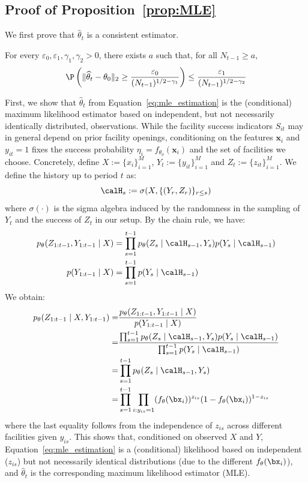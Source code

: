 \documentclass[blindrev]{informs3noheader}
\begin{document}
\subsection{Proof of Proposition~\ref{prop:MLE}}
We first prove that $\widehat{\theta}_t$ is a consistent estimator.
\begin{lemma}\label{lem:mle}
For every $\varepsilon_0, \varepsilon_1,\gamma_1,\gamma_2>0$, there exists $a$ such that, for all $N_{t-1}\geq a$,
         \begin{align}
        \P\left(\|\widehat{\theta}_t-\theta_0\|_2\geq  \frac{\varepsilon_0}{(N_{t-1})^{1/2-\gamma_1}}\right)\leq\frac{\varepsilon_1}{(N_{t-1})^{1/2-\gamma_2}} \label{eq:mle_bound}
    \end{align}
\end{lemma} 
First, we show that $\widehat{\theta}_t$ from Equation~\eqref{eq:mle_estimation} is the (conditional) maximum likelihood estimator based on independent, but not necessarily identically distributed, observations. While the facility success indicators $S_{it}$ may in general depend on prior facility openings, conditioning on the features $\bm{x}_i$ and $y_{it}=1$ fixes the success probability $\eta_i = f_{\theta_0}(\bm{x}_i)$ and the set of facilities we choose. Concretely, define $X :=\{x_i\}_{i=1}^M$, $Y_t:=\{y_{it}\}_{i=1}^M$ and $Z_t:=\{z_{it}\}_{i=1}^M$. We define the history up to period $t$ as:
\[\calH_s:=\sigma(X,\{(Y_r,Z_r)\}_{r\leq s})\]
where $\sigma(\cdot)$ is the sigma algebra induced by the randomness in the sampling of $Y_t$ and the success of $Z_t$ in our setup. By the chain rule, we have:
\begin{align*}
p_\theta(Z_{1:t-1},Y_{1:t-1} \mid X) &= \prod_{s=1}^{t-1} p_\theta(Z_s \mid \calH_{s-1}, Y_s) p(Y_s \mid \calH_{s-1})\\
p(Y_{1:t-1} \mid X) &= \prod_{s=1}^{t-1}  p(Y_s \mid \calH_{s-1})
\end{align*}
We obtain:
\begin{align*}
p_\theta(Z_{1:t-1} \mid X, Y_{1:t-1})
=&\frac{p_\theta(Z_{1:t-1},Y_{1:t-1} \mid X)}{p(Y_{1:t-1} \mid X)}
\\=&\frac{\prod_{s=1}^{t-1} p_\theta(Z_s \mid \calH_{s-1}, Y_s) p(Y_s \mid \calH_{s-1})}{\prod_{s=1}^{t-1}  p(Y_s \mid \calH_{s-1})}
\\=&\prod_{s=1}^{t-1} p_\theta(Z_s \mid \calH_{s-1}, Y_s)
\\=& \prod_{s=1}^{t-1} \prod_{i: y_{is}=1} (f_\theta(\bx_{i}))^{z_{is}}(1-f_\theta(\bx_{i}))^{1-z_{is}}
\end{align*}
where the last equality follows from the independence of $z_{is}$ across different facilities given $y_{is}$. This shows that, conditioned on observed $X$ and $Y$, Equation~\eqref{eq:mle_estimation} is a (conditional) likelihood based on independent ($z_{is}$) but not necessarily identical distributions (due to the different $f_\theta(\bx_i)$), and $\hat{\theta}_t$ is the corresponding maximum likelihood estimator (MLE).
\end{document}
